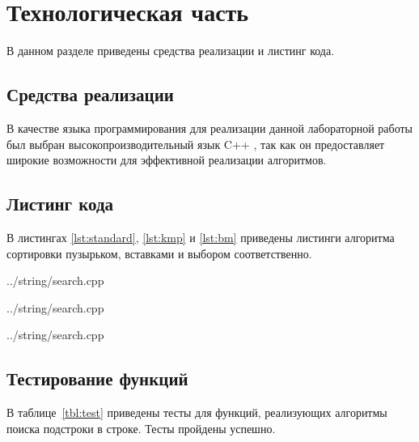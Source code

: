 \chapter{Технологическая часть}

В данном разделе приведены средства реализации и листинг кода.

\section{Средства реализации}

В качестве языка программирования для реализации данной лабораторной работы был выбран высокопроизводительный язык C++ \cite{cpp17}, так как он предоставляет широкие возможности для эффективной реализации алгоритмов.

\section{Листинг кода}

В листингах \ref{lst:standard}, \ref{lst:kmp} и \ref{lst:bm} приведены листинги алгоритма сортировки пузырьком, вставками и выбором соответственно.

\begin{lstinputlisting}[
	caption={Стандартный алгоритм},
	label={lst:standard},
	style={cpp},
	linerange={6-26}
]{../string/search.cpp}
\end{lstinputlisting}

\begin{lstinputlisting}[
	caption={Алгоритм Кнута — Морриса — Пратта},
	label={lst:kmp},
	style={cpp},
	linerange={28-68}
]{../string/search.cpp}
\end{lstinputlisting}

\begin{lstinputlisting}[
	caption={Алгоритм Бойера — Мура},
	label={lst:bm},
	style={cpp},
	linerange={70-112}
]{../string/search.cpp}
\end{lstinputlisting}

\section{Тестирование функций}

В таблице~\ref{tbl:test} приведены тесты для функций, реализующих алгоритмы поиска подстроки в строке.
Тесты пройдены успешно.


